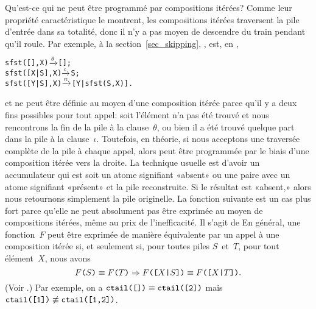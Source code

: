 Qu'est-ce qui ne peut être programmé par compositions itérées? Com\-me
leur propriété caractéristique le montrent, les compositions itérées
traversent la pile d'entrée dans sa totalité, donc il n'y a pas moyen
de descendre du train pendant qu'il roule. Par exemple,  à
la section~\ref{sec_skipping}, , est, en
\Erlang,
\begin{alltt}
sfst(   [],X) \(\smashedrightarrow{\theta}\) [];
sfst([X|S],X) \(\smashedrightarrow{\iota}\) S;
sfst([Y|S],X) \(\smashedrightarrow{\kappa}\) [Y|sfst(S,X)].
\end{alltt}
et ne peut être définie au moyen d'une composition itérée parce qu'il
y a deux fins possibles pour tout appel: soit l'élément n'a pas été
trouvé et nous rencontrons la fin de la pile à la clause~\(\theta\),
ou bien il a été trouvé quelque part dans la pile à la
clause~\(\iota\). Toutefois, en théorie, si nous acceptons une
traversée complète de la pile à chaque appel, alors 
peut être programmée par le biais d'une composition itérée vers la
droite. La technique usuelle est d'avoir un accumulateur qui est soit
un atome signifiant «absent» ou une paire avec un atome signifiant
«présent» et la pile reconstruite. Si le résultat est «absent,» alors
nous retournons simplement la pile originelle. La fonction suivante
est un cas plus fort parce qu'elle ne peut absolument pas être
exprimée au moyen de compositions itérées, même au prix de
l'inefficacité. Il s'agit de
\label{code_ctail}  En général, une
fonction~\(F\) peut être exprimée de manière équivalente par un appel
à une composition itérée si, et seulement si, pour toutes piles
\(S\)~et~\(T\), pour tout élément~\(X\), nous avons
\begin{equation*}
\texttt{\(F\)(\(S\))} \equiv \texttt{\(F\)(\(T\))}
\Rightarrow
\texttt{\(F\)([\(X\)|\(S\)])}
\equiv
\texttt{\(F\)([\(X\)|\(T\)])}.
\end{equation*}
(Voir \cite{GibbonsHuttonAltenkirch_2001,WeberCaldwell_2004}.) Par
exemple, on a \(\texttt{ctail([])} \equiv \texttt{ctail([2])}\) mais
\(\texttt{ctail([1])} \mathrel{\not\equiv} \texttt{ctail([1,2])}\).

